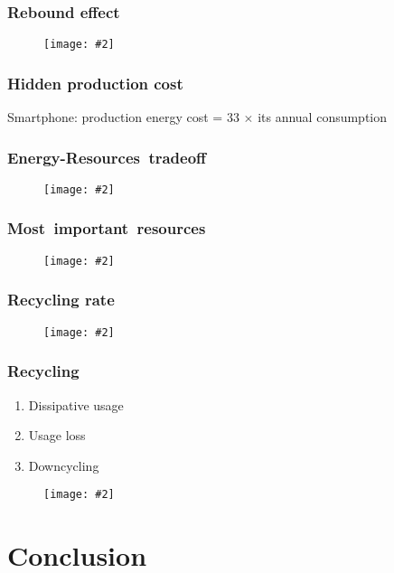 \documentclass[10pt]{beamer}
\newcommand{\imgtw}[2][1]{%
  \begin{figure}%
    \centering%
    \texttt{[image: \#2]}%
  \end{figure}%
}
\begin{document}
\begin{frame}
  \frametitle{Rebound effect}


\end{frame}

\begin{frame}[standout]
  \imgtw{lean-energy-intensity}
\end{frame}

\begin{frame}
  \frametitle{Hidden production cost}

  Smartphone: production energy cost = 33 $\times$ its annual
  consumption

\end{frame}


\begin{frame}[standout]
  \frametitle{Energy-Resources tradeoff}
  \imgtw[.9]{energy-resources}
\end{frame}

\begin{frame}[standout]
  \frametitle{Most important resources}
  \imgtw[.9]{lean-metals}
\end{frame}

\begin{frame}[standout]
  \frametitle{Recycling rate}
  \imgtw[.9]{lean-recycling-rate}
\end{frame}

\begin{frame}
  \frametitle{Recycling}


  \begin{enumerate}[<+->]
  \item Dissipative usage
  \item Usage loss
  \item Downcycling
  \end{enumerate}

\end{frame}

\begin{frame}[standout]
  \imgtw[.9]{recycling-cycle}
\end{frame}

\section{Conclusion}
\end{document}
